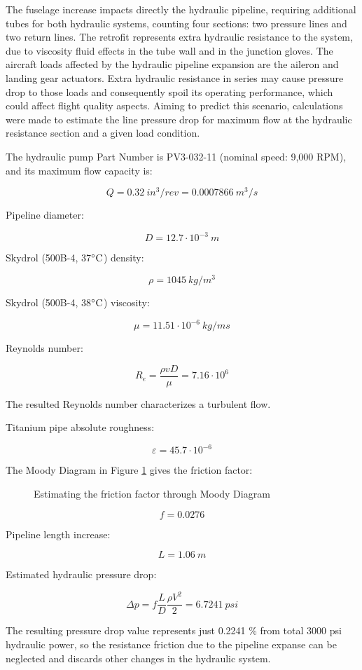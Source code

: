 The fuselage increase impacts directly the hydraulic pipeline, requiring additional tubes for both hydraulic systems, counting four sections: two pressure lines and two return lines. The retrofit represents extra hydraulic resistance to the system, due to viscosity fluid effects in the tube wall and in the junction gloves. The aircraft loads affected by the hydraulic pipeline expansion are the aileron and landing gear actuators. Extra hydraulic resistance in series may cause pressure drop to those loads and consequently spoil its operating performance, which could affect flight quality aspects. Aiming to predict this scenario, calculations were made to estimate the line pressure drop for maximum flow at the hydraulic resistance section and a given load condition.

The hydraulic pump Part Number is PV3-032-11 (nominal speed: 9,000 RPM), and its maximum flow capacity is:

\[Q=0.32\ in^{3}/rev=0.0007866\ m^{3}/s\]

Pipeline diameter:

\[D=12.7\cdot 10^{-3}\ m\]

Skydrol (500B-4, 37$\celsius$) density:

\[\rho =1045\ kg/m^{3}\]

Skydrol (500B-4, 38$\celsius$) viscosity:

\[\mu =11.51\cdot 10^{-6}\ kg/ms\]

Reynolds number:

\[R_{e}=\frac{\rho vD}{\mu }=7.16\cdot 10^{6}\]

The resulted Reynolds number characterizes a turbulent flow.

Titanium pipe absolute roughness:

\[\varepsilon =45.7\cdot 10^{-6}\]

The Moody Diagram in Figure \ref{fig:moody} gives the friction factor:

\begin{figure}[H] %
\caption{Estimating the friction factor through Moody Diagram}
\label{fig:moody}
\end{figure}


\[f=0.0276\]

Pipeline length increase:

\[L=1.06\ m\]

Estimated hydraulic pressure drop:

\[\Delta p=f\frac{L}{D}\frac{\rho V^{2}}{2}=6.7241\ psi\]

The resulting pressure drop value represents just 0.2241 \% from total 3000 psi hydraulic power, so the resistance friction due to the pipeline expanse can be neglected and discards other changes in the hydraulic system.
